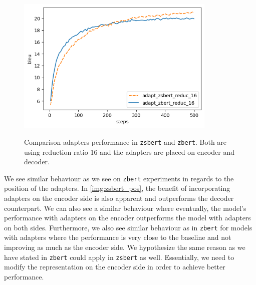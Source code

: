 \begin{figure}[h]
    {\includegraphics[width=0.85\textwidth]{img/zbert_vs_zsbert.png}}
    \centering
    \caption{Comparison adapters performance in \texttt{zsbert} and \texttt{zbert}. Both are using reduction ratio 16 and the adapters are placed on encoder and decoder.}
    \label{img:zbert_vs_zsbert}
\end{figure}

We see similar behaviour as we see on \texttt{zbert} experiments in regards to the position of the adapters. In \cref{img:zsbert_pos}, the benefit of incorporating adapters on the encoder side is also apparent and outperforms the decoder counterpart. We can also see a similar behaviour where eventually, the model's performance with adapters on the encoder outperforms the model with adapters on both sides. Furthermore, we also see similar behaviour as in \texttt{zbert} for models with adapters where the performance is very close to the baseline and not improving as much as the encoder side. We hypothesize the same reason as we have stated in \texttt{zbert} could apply in \texttt{zsbert} as well. Essentially, we need to modify the representation on the encoder side in order to achieve better performance.

